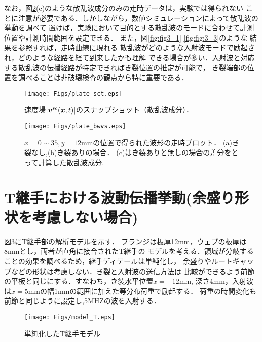 なお，図\ref{fig:fig3_4}(c)のような散乱波成分のみの走時データは，実験では得られない
ことに注意が必要である．しかしながら，数値シミュレーションによって散乱波の挙動を調べて
置けば，実験において目的とする散乱波のモードに合わせて計測位置や計測時間範囲を設定できる．
また，図\ref{fig:fig3_1}-\ref{fig:fig:3_3}のような 結果を参照すれば，走時曲線に現れる
散乱波がどのような入射波モードで励起され，どのような経路を経て到来したかも理解
できる場合が多い．入射波と対応する散乱波の伝播経路が特定できればき裂位置の推定が可能で，
き裂端部の位置を調べることは非破壊検査の観点から特に重要である．
\begin{figure}[h]
	\begin{center}
	\texttt{[image: Figs/plate\_sct.eps]} 
	\end{center}
	\caption{
		速度場$|\mbox{\boldmath $v$}^{sc}(\mbox{\boldmath $x$},t)|$のスナップショット（散乱波成分）．
	} 
	\label{fig:fig3_3}
\end{figure}
\begin{figure}[h]
	\begin{center}
	\texttt{[image: Figs/plate\_bwvs.eps]} 
	\end{center}
	\caption{
		$x=0\sim35, y=12$mmの位置で得られた波形の走時プロット．
		(a)き裂なし,(b)き裂ありの場合．
		(c)はき裂ありと無しの場合の差分をとって計算した散乱波成分.
	} 
	\label{fig:fig3_4}
\end{figure}
\section{T継手における波動伝播挙動(余盛り形状を考慮しない場合)}
図\ref{fig:fig3_01}にT継手部の解析モデルを示す．
フランジは板厚12mm，ウェブの板厚は8mmとし，両者が直角に接合されたT継手の
モデルを考える．領域が分岐することの効果を調べるため，継手ディテールは単純化し，
余盛りやルートギャップなどの形状は考慮しない．き裂と入射波の送信方法は
比較ができるよう前節の平板と同じにする．すなわち，き裂水平位置$x=-12$mm, 
深さ4mm，入射波は$x=5$mmの幅1mmの範囲に加えた等分布荷重で励起する．
荷重の時間変化も前節と同じように設定し,5MHZの波を入射する．
\begin{figure}[h]
	\begin{center}
	\texttt{[image: Figs/model\_T.eps]} 
	\end{center}
	\caption{
		単純化したT継手モデル
	} 
	\label{fig:fig3_01}
\end{figure}
